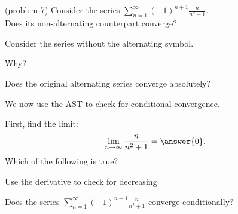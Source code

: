 \documentclass{ximera}
\begin{document}
\begin{problem}(problem 7)
Consider the series $\displaystyle{\sum_{n=1}^\infty (-1)^{n+1} \frac{n}{n^2 + 1}}$.\\
Does its non-alternating counterpart converge?
\begin{hint} 
Consider the series without the alternating symbol.
\end{hint}
\begin{multipleChoice}
\end{multipleChoice}

Why?
\begin{multipleChoice}
\end{multipleChoice}




Does the original alternating series converge absolutely?
\begin{multipleChoice}
\end{multipleChoice}

We now use the AST to check for conditional convergence.

First, find the limit:
\[
\lim_{n\to\infty} \frac{n}{n^2 + 1} = \answer{0}.
\]
Which of the following is true? 
\begin{hint}
Use the derivative to check for decreasing
\end{hint}
\begin{multipleChoice}
\end{multipleChoice}


Does the series $\displaystyle{\sum_{n=1}^\infty (-1)^{n+1} \frac{n}{n^2 + 1}}$ converge conditionally?
\begin{multipleChoice}
\end{multipleChoice}

\end{problem}
\end{document}
